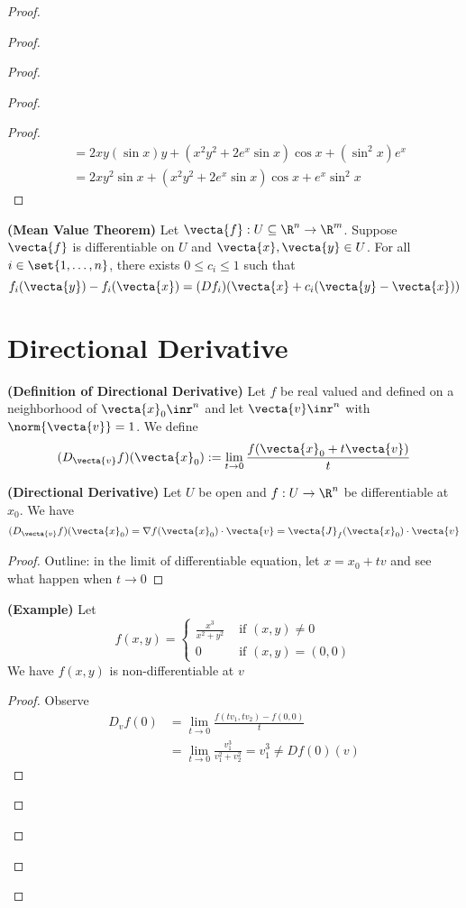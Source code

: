\documentclass{report}
\begin{document}
\begin{proof}
\begin{proof}
\begin{proof}
\begin{proof}
\begin{proof}
\begin{align}
  &=2xy(\sin x)y+(x^2y^2+2e^x \sin x)\cos x+(\sin^2 x)e^x\\
  &=2xy^2\sin x+(x^2y^2+2e^x\sin x) \cos x+ e^x\sin^2 x
\end{align}
\end{proof}
\begin{theorem}
\label{8.3.7}
\textbf{(Mean Value Theorem)} Let $\vecta{f}:U\subseteq \R^n\rightarrow \R^m$. Suppose $\vecta{f}$ is differentiable on $U$ and $\vecta{x},\vecta{y}\in U$. For all $i\in \set{1,\dots , n}$, there exists $0\leq c_i\leq 1$ such that 
\begin{equation}
f_i(\vecta{y})-f_i(\vecta{x})=(Df_i)(\vecta{x}+c_i(\vecta{y}-\vecta{x}))
\end{equation}
\end{theorem}
\section{Directional Derivative}
\begin{definition}
\label{8.4.1}
  \textbf{(Definition of Directional Derivative)} Let $f$ be real valued and defined on a neighborhood of $\vecta{x}_0 \inr^n$ and let $\vecta{v}\inr^n$ with $\norm{\vecta{v}}=1$. We define 
  \begin{equation}
    (D_\vecta{v}f)(\vecta{x}_0):=\lim_{t\to 0}\frac{f(\vecta{x}_0+t\vecta{v})}{t}
  \end{equation}
\end{definition}
\begin{theorem}
\label{8.4.2}
\textbf{(Directional Derivative)} Let $U$ be open and $f:U\rightarrow \R^n$ be differentiable at $x_0$. We have
 \begin{equation}
   (D_{\vecta{v}}f)(\vecta{x}_0)=\nabla f(\vecta{x}_0)\cdot \vecta{v}=\vecta{J}_f(\vecta{x}_0)\cdot \vecta{v}
\end{equation}
\end{theorem}
\begin{proof}
Outline: in the limit of differentiable equation, let $x=x_0+tv$ and see what happen when  $t \to 0$
\end{proof}
\begin{theorem}
\label{8.4.3}
\textbf{(Example)} Let
\begin{equation}
f(x,y)=\begin{cases}
  \frac{x^3}{x^2+y^2}& \text{ if  }(x,y)\neq 0\\
  0 & \text{ if  }(x,y)=(0,0)
\end{cases}
\end{equation}
We have $f(x,y)$ is non-differentiable at $v$
\end{theorem}
\begin{proof}
Observe
\begin{align}
D_vf(0)&=\lim_{t \to 0}\frac{f(tv_1,tv_2)-f(0,0)}{t}\\
&=\lim_{t\to0}\frac{v_1^3}{v_1^2+v_2^2}=v_1^3\neq Df(0)(v)
\end{align}
\end{proof}

\end{proof}
\end{proof}
\end{proof}
\end{proof}
\end{document}
